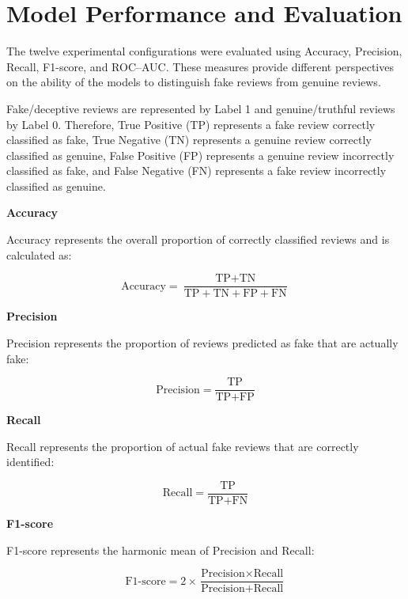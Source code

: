 \documentclass[12pt,a4paper]{report}
\begin{document}
\section{Model Performance and Evaluation}

The twelve experimental configurations were evaluated using Accuracy,
Precision, Recall, F1-score, and ROC--AUC. These measures provide
different perspectives on the ability of the models to distinguish
fake reviews from genuine reviews.

Fake/deceptive reviews are represented by Label 1 and genuine/truthful
reviews by Label 0. Therefore, True Positive (TP) represents a fake
review correctly classified as fake, True Negative (TN) represents a
genuine review correctly classified as genuine, False Positive (FP)
represents a genuine review incorrectly classified as fake, and False
Negative (FN) represents a fake review incorrectly classified as
genuine.

\noindent\textbf{Accuracy}

Accuracy represents the overall proportion of correctly classified
reviews and is calculated as:

\begin{equation}
\text{Accuracy} =
\frac{\text{TP} + \text{TN}}
{\text{TP} + \text{TN} + \text{FP} + \text{FN}}
\end{equation}

\noindent\textbf{Precision}

Precision represents the proportion of reviews predicted as fake that
are actually fake:

\begin{equation}
\text{Precision} =
\frac{\text{TP}}
{\text{TP} + \text{FP}}
\end{equation}

\noindent\textbf{Recall}

Recall represents the proportion of actual fake reviews that are
correctly identified:

\begin{equation}
\text{Recall} =
\frac{\text{TP}}
{\text{TP} + \text{FN}}
\end{equation}

\noindent\textbf{F1-score}

F1-score represents the harmonic mean of Precision and Recall:

\begin{equation}
\text{F1-score} =
2 \times
\frac{\text{Precision} \times \text{Recall}}
{\text{Precision} + \text{Recall}}
\end{equation}
\end{document}
